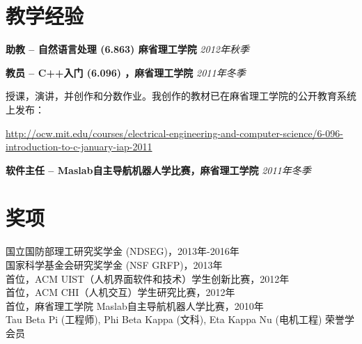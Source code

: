 \documentclass[margin,line]{resume}
\begin{document}
\begin{resume}
\section{\mysidestyle 教学经验}

\textbf{助教 -- 自然语言处理 (6.863) 麻省理工学院} \hfill \textsl{2012年秋季} \\

\vspace{-5mm}

\textbf{教员 -- C++入门 (6.096) ，麻省理工学院} \hfill \textsl{2011年冬季}\\

\vspace{-4mm}

\vspace{-4mm}

授课，演讲，并创作和分数作业。我创作的教材已在麻省理工学院的公开教育系统上发布：

\vspace{-4mm}

\url{http://ocw.mit.edu/courses/electrical-engineering-and-computer-science/6-096-introduction-to-c-january-iap-2011} \\

\vspace{-5mm}

\textbf{软件主任 -- Maslab自主导航机器人学比赛，麻省理工学院} \hfill \textsl{2011年冬季}\\

\vspace{-4mm}

\section{\mysidestyle 奖项}

国立国防部理工研究奖学金 (NDSEG)，2013年-2016年 \\
国家科学基金会研究奖学金 (NSF GRFP)，2013年 \\
首位，ACM UIST（人机界面软件和技术）学生创新比赛，2012年 \\
首位，ACM CHI（人机交互）学生研究比赛，2012年 \\
首位，麻省理工学院 Maslab自主导航机器人学比赛，2010年 \\
Tau Beta Pi (工程师), Phi Beta Kappa (文科), Eta Kappa Nu (电机工程) 荣誉学会员 \\

\pagebreak



\end{resume}
\end{document}
